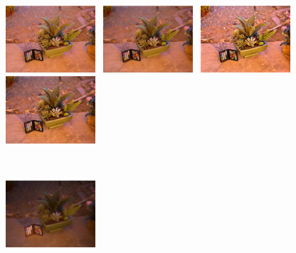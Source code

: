 \begin{figure}[tb]
\centering
	\begin{minipage}[b]{0.24\hsize}
		\centering
		\includegraphics[width=35mm, height = 25mm]{images/experiment/parameter/reflectance/0.001-0.001.eps}
	\end{minipage}
	\begin{minipage}[b]{0.24\hsize}
		\centering
		\includegraphics[width=35mm, height = 25mm]{images/experiment/parameter/reflectance/0.001-0.01.eps}
	\end{minipage}
	\begin{minipage}[b]{0.24\hsize}
		\centering
		\includegraphics[width=35mm, height = 25mm]{images/experiment/parameter/reflectance/0.01-0.001.eps}
	\end{minipage}
	\begin{minipage}[b]{0.24\hsize}
		\centering
		\includegraphics[width=35mm, height = 25mm]{images/experiment/parameter/reflectance/0.01-0.01.eps}
	\end{minipage}\\
	\vspace{3mm}
	\begin{minipage}[b]{0.24\hsize}
			\centering
			\includegraphics[width=35mm, height =25mm]{images/experiment/parameter/illumination/0.001-0.001.eps}

\end{minipage}
\end{figure}
